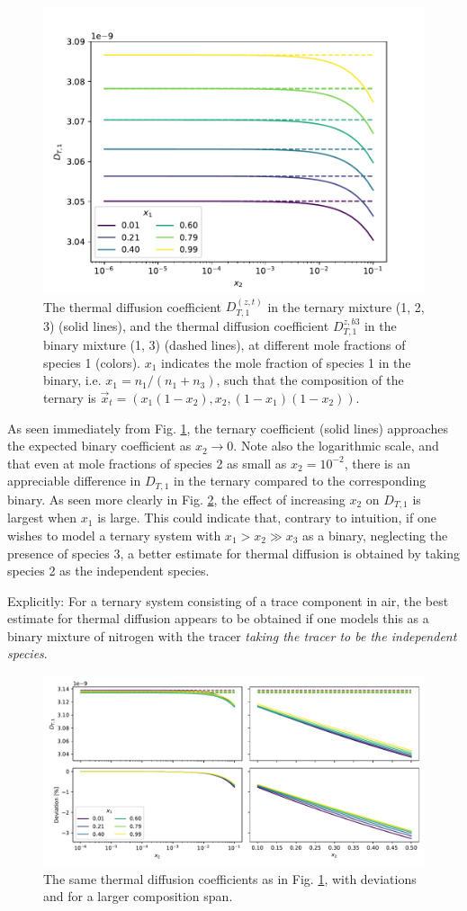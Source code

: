 \begin{figure}[htb]
    \centering
    \includegraphics[width=.6\textwidth]{ternary_DT.pdf}
    \caption{The thermal diffusion coefficient $D_{T,1}^{(z, t)}$ in the ternary mixture (1, 2, 3) (solid lines), and the thermal diffusion coefficient $D_{T,1}^{z, b3}$ in the binary mixture (1, 3) (dashed lines), at different mole fractions of species 1 (colors). $x_1$ indicates the mole fraction of species 1 in the binary, i.e. $x_1 = n_1 / (n_1 + n_3)$, such that the composition of the ternary is $\Vec{x}_t = (x_1(1 - x_2), x_2, (1 - x_1)(1 - x_2))$.}
    \label{fig:ternary_DT}
\end{figure}

As seen immediately from Fig. \ref{fig:ternary_DT}, the ternary coefficient (solid lines) approaches the expected binary coefficient as $x_2 \to 0$. Note also the logarithmic scale, and that even at mole fractions of species 2 as small as $x_2 = 10^{-2}$, there is an appreciable difference in $D_{T,1}$ in the ternary compared to the corresponding binary. As seen more clearly in Fig. \ref{fig:ternary_DT_large}, the effect of increasing $x_2$ on $D_{T,1}$ is largest when $x_1$ is large. This could indicate that, contrary to intuition, if one wishes to model a ternary system with $x_1 > x_2 \gg x_3$ as a binary, neglecting the presence of species 3, a better estimate for thermal diffusion is obtained by taking species 2 as the independent species.

Explicitly: For a ternary system consisting of a trace component in air, the best estimate for thermal diffusion appears to be obtained if one models this as a binary mixture of nitrogen with the tracer \textit{taking the tracer to be the independent species}.

\begin{figure}[htb]
    \centering
    \includegraphics[width=.85\textwidth]{ternary_DT_large.pdf}
    \caption{The same thermal diffusion coefficients as in Fig. \ref{fig:ternary_DT}, with deviations and for a larger composition span.}
    \label{fig:ternary_DT_large}
\end{figure}
